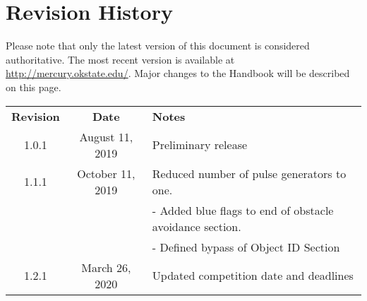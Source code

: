\section*{Revision History}
Please note that only the latest version of this document is considered authoritative. The most recent version is available at \url{http://mercury.okstate.edu/}. Major changes to the Handbook will be described on this page.

\begin{tabular}{ccl}
\textbf{Revision}			&	\textbf{Date}							&	\textbf{Notes} \\
1.0.1					&	 	August 11, 2019					&	Preliminary release \\
1.1.1					&		October 11, 2019					&	Reduced number of pulse generators to one. \\
						&										&       - Added blue flags to end of obstacle avoidance section.	\\
						&										& 	- Defined bypass of Object ID Section \\
1.2.1					&		March 26, 2020					&	Updated competition date and deadlines
\end{tabular}